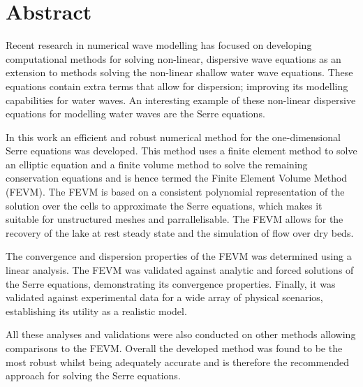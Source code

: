 \chapter*{Abstract}\label{abstract}


Recent research in numerical wave modelling has focused on developing computational methods for solving non-linear, dispersive wave equations as an extension to methods solving the non-linear shallow water wave equations. These equations contain extra terms that allow for dispersion; improving its modelling capabilities for water waves. An interesting example of these non-linear dispersive equations for modelling water waves are the Serre equations. 

In this work an efficient and robust numerical method for the one-dimensional Serre equations was developed. This method uses a finite element method to solve an elliptic equation and a finite volume method to solve the remaining conservation equations and is hence termed the Finite Element Volume Method (FEVM). The FEVM is based on a consistent polynomial representation of the solution over the cells to approximate the Serre equations, which makes it suitable for unstructured meshes and parrallelisable. The FEVM allows for the recovery of the lake at rest steady state and the simulation of flow over dry beds.  

The convergence and dispersion properties of the FEVM was determined using a linear analysis. The FEVM was validated against analytic and forced solutions of the Serre equations, demonstrating its convergence properties. Finally, it was validated against experimental data for a wide array of physical scenarios, establishing its utility as a realistic model.

All these analyses and validations were also conducted on other methods allowing comparisons to the FEVM. Overall the developed method was found to be the most robust whilst being adequately accurate and is therefore the recommended approach for solving the Serre equations.


